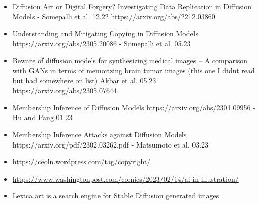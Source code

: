 \begin{itemize}
    \item Diffusion Art or Digital Forgery? Investigating Data Replication in Diffusion Models - Somepalli et al. 12.22 https://arxiv.org/abs/2212.03860
    \item Understanding and Mitigating Copying in Diffusion Models https://arxiv.org/abs/2305.20086 - Somepalli et al. 05.23
    \item Beware of diffusion models for synthesizing medical images -- A comparison with GANs in terms of memorizing brain tumor images (this one I didnt read but had somewhere on list) Akbar et al. 05.23 https://arxiv.org/abs/2305.07644
    \item Membership Inference of Diffusion Models https://arxiv.org/abs/2301.09956 - Hu and Pang 01.23
    \item Membership Inference Attacks against Diffusion Models https://arxiv.org/pdf/2302.03262.pdf - Matsumoto et al. 03.23
    \item \url{https://ceoln.wordpress.com/tag/copyright/}
    \item \url{https://www.washingtonpost.com/comics/2023/02/14/ai-in-illustration/}
    \item  \href{https://lexica.art/}{Lexica.art} is a search engine for Stable Diffusion generated images
\end{itemize}